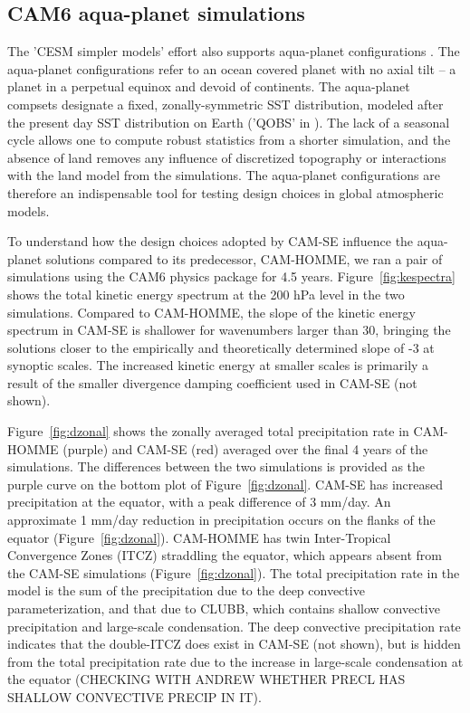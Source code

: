 \subsection{CAM6 aqua-planet simulations}
The 'CESM simpler models' effort also supports aqua-planet configurations \citep{MWO2016JAMES}. The aqua-planet configurations \citep{NH2000ASL} refer to an ocean covered planet with no axial tilt -- a planet in a perpetual equinox and devoid of continents. The aqua-planet compsets designate a fixed, zonally-symmetric SST distribution, modeled after the present day SST distribution on Earth ('QOBS' in \cite{NH2000ASL}). The lack of a seasonal cycle allows one to compute robust statistics from a shorter simulation, and the absence of land removes any influence of discretized topography or interactions with the land model from the simulations. The aqua-planet configurations are therefore an indispensable tool for testing design choices in global atmospheric models.

To understand how the design choices adopted by CAM-SE influence the aqua-planet solutions compared to its predecessor, CAM-HOMME, we ran a pair of simulations using the CAM6 physics package {\color{red}{[CAM6 reference]}} for 4.5 years. Figure~\ref{fig:kespectra} shows the total kinetic energy spectrum at the 200 hPa level in the two simulations. Compared to CAM-HOMME, the slope of the kinetic energy spectrum in CAM-SE is shallower for wavenumbers larger than 30, bringing the solutions closer to the empirically \citep{NG1985JAS} and theoretically \citep{C1971JAS} determined slope of -3 at synoptic scales. The increased kinetic energy at smaller scales is primarily a result of the smaller divergence damping coefficient used in CAM-SE (not shown).

 Figure~\ref{fig:dzonal} shows the zonally averaged total precipitation rate in CAM-HOMME (purple) and CAM-SE (red) averaged over the final 4 years of the simulations. The differences between the two simulations is provided as the purple curve on the bottom plot of Figure~\ref{fig:dzonal}. CAM-SE has increased precipitation at the equator, with a peak difference of 3 mm/day. An approximate 1 mm/day reduction in precipitation occurs on the flanks of the equator (Figure~\ref{fig:dzonal}). CAM-HOMME has twin Inter-Tropical Convergence Zones (ITCZ) straddling the equator, which appears absent from the CAM-SE simulations (Figure~\ref{fig:dzonal}). The total precipitation rate in the model is the sum of the precipitation due to the deep convective parameterization, and that due to CLUBB, which contains shallow convective precipitation and large-scale condensation. The deep convective precipitation rate indicates that the double-ITCZ does exist in CAM-SE (not shown), but is hidden from the total precipitation rate due to the increase in large-scale condensation at the equator (CHECKING WITH ANDREW WHETHER PRECL HAS SHALLOW CONVECTIVE PRECIP IN IT).

